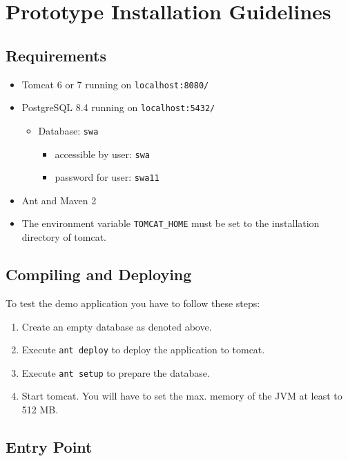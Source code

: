 \documentclass[11pt]{article}
\begin{document}
\newpage

\section{Prototype Installation Guidelines}

\subsection{Requirements}

\begin{itemize}
\item Tomcat 6 or 7 running on \texttt{localhost:8080/}
\item PostgreSQL 8.4 running on \texttt{localhost:5432/}
	\begin{itemize}
	\item Database: \texttt{swa}
		\begin{itemize}
		\item accessible by user: \texttt{swa}
		\item password for user: \texttt{swa11}
		\end{itemize}
	\end{itemize}
\item Ant and Maven 2
\item The environment variable \texttt{TOMCAT\_HOME} must be set to the installation directory of tomcat.
\end{itemize}

\subsection{Compiling and Deploying}

To test the demo application you have to follow these steps:

\begin{enumerate}
\item Create an empty database as denoted above.
\item Execute \texttt{ant deploy} to deploy the application to tomcat.
\item Execute \texttt{ant setup} to prepare the database.
\item Start tomcat. You will have to set the max. memory of the JVM at least to 512 MB.
\end{enumerate}

\subsection{Entry Point}
\end{document}
